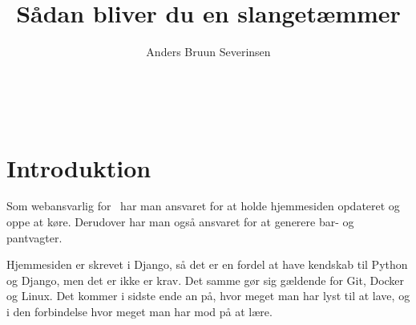 

\title{Sådan bliver du en slangetæmmer}
\date{}
\author{Anders Bruun Severinsen}



\maketitle

\tableofcontents \

\section{Introduktion}

Som webansvarlig for \fredagscafeen\ har man ansvaret for at holde hjemmesiden opdateret og oppe at køre.
Derudover har man også ansvaret for at generere bar- og pantvagter.

Hjemmesiden er skrevet i Django, så det er en fordel at have kendskab til Python og Django, men det er
ikke er krav. Det samme gør sig gældende for Git, Docker og Linux. Det kommer i sidste ende an på, hvor
meget man har lyst til at lave, og i den forbindelse hvor meget man har mod på at lære.











